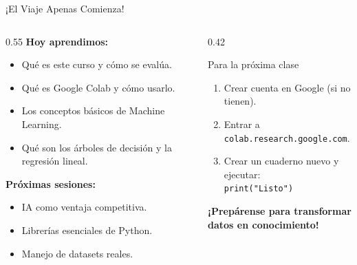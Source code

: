 \documentclass[aspectratio=169]{beamer}
\newcommand{\tech}[1]{\texttt{\textcolor{mainColor}{#1}}}
\begin{document}
\begin{frame}{¡El Viaje Apenas Comienza!}
  \begin{columns}[T]
    \begin{column}{0.55\textwidth}
      \small
      \textbf{Hoy aprendimos:}
      \begin{itemize}\setlength\itemsep{4pt}
        \item[\textcolor{mainColor}{\faCheck}] Qué es este curso y cómo se evalúa.
        \item[\textcolor{mainColor}{\faCheck}] Qué es Google Colab y cómo usarlo.
        \item[\textcolor{mainColor}{\faCheck}] Los conceptos básicos de Machine Learning.
        \item[\textcolor{mainColor}{\faCheck}] Qué son los árboles de decisión y la regresión lineal.
      \end{itemize}
      \vspace{0.3cm}
      \textbf{Próximas sesiones:}
      \begin{itemize}\setlength\itemsep{3pt}
        \item IA como ventaja competitiva.
        \item Librerías esenciales de Python.
        \item Manejo de datasets reales.
      \end{itemize}
    \end{column}
    \begin{column}{0.42\textwidth}
      \begin{alertblock}{\faLightbulb\enspace Para la próxima clase}
        \small
        \begin{enumerate}\setlength\itemsep{3pt}
          \item Crear cuenta en Google (si no tienen).
          \item Entrar a \tech{colab.research.google.com}.
          \item Crear un cuaderno nuevo y ejecutar:\\
                \tech{print("Listo")}
        \end{enumerate}
      \end{alertblock}
      \vspace{0.3cm}
      \centering
      \large\textbf{¡Prepárense para transformar\\datos en conocimiento!}
    \end{column}
  \end{columns}
\end{frame}
\end{document}
